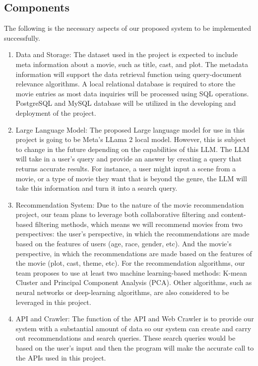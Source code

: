 \documentclass[journal]{IEEEtran}
\begin{document}
\subsection{Components}
The following is the necessary aspects of our proposed system to be implemented successfully.
\begin{enumerate}
    \item {Data and Storage}: The dataset used in the project is expected to include meta information about a movie, such as title, cast, and plot. The metadata information will support the data retrieval function using query-document relevance algorithms. A local relational database is required to store the movie entries as most data inquiries will be processed using SQL operations. PostgreSQL and MySQL database will be utilized in the developing and deployment of the project. 

    \item {Large Language Model}: The proposed Large language model for use in this project is going to be Meta’s LLama 2 local model. However, this is subject to change in the future depending on the capabilities of this LLM. The LLM will take in a user’s query and provide an answer by creating a query that returns accurate results. For instance, a user might input a scene from a movie, or a type of movie they want that is beyond the genre, the LLM will take this information and turn it into a search query.

    \item {Recommendation System}: Due to the nature of the movie recommendation project,  our team plans to leverage both collaborative filtering and content-based filtering methods, which means we will recommend movies from two perspectives: the user's perspective, in which the recommendations are made based on the features of users (age, race, gender, etc). And the movie’s perspective, in which the recommendations are made based on the features of the movie (plot, cast, theme, etc). For the recommendation algorithms, our team proposes to use at least two machine learning-based methods: K-mean Cluster and Principal Component Analysis (PCA). Other algorithms, such as neural networks or deep-learning algorithms, are also considered to be leveraged in this project.

    \item {API and Crawler}: The function of the API and Web Crawler is to provide our system with a substantial amount of data so our system can create and carry out recommendations and search queries. These search queries would be based on the user’s input and then the program will make the accurate call to the APIs used in this project.


\end{enumerate}
\end{document}
